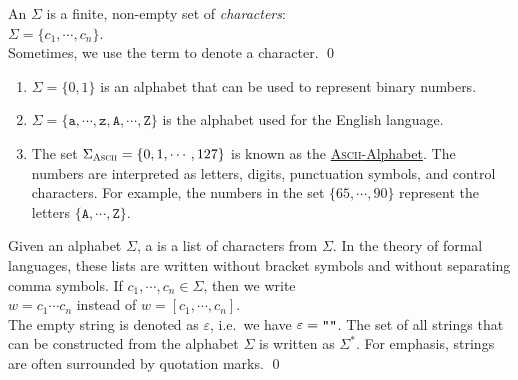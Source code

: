 \begin{Definition}[Alphabet]
An  $\Sigma$  is a finite, non-empty set of \emph{characters}:
\\[0.2cm]
\hspace*{1.3cm}
$\Sigma = \{ c_1, \cdots, c_n \}$. 
\\[0.2cm]
Sometimes, we use the term   to denote a character.
\qed
\end{Definition}

\examplesEng
\begin{enumerate}
\item $\Sigma = \{ 0, 1\}$ is an alphabet that can be used to represent binary numbers.
\item $\Sigma = \{ \mathtt{a}, \cdots, \mathtt{z}, \mathtt{A}, \cdots, \mathtt{Z} \}$ 
      is the alphabet used for the English language.
\item The set $\Sigma_{\textsc{\scriptsize Ascii}} = \{ 0, 1, \cdots, 127 \}$ is known as the
      \href{http://en.wikipedia.org/wiki/ASCII}{\textsc{Ascii}-Alphabet}.  The numbers are
      interpreted as letters, digits, punctuation symbols, and control characters.
      For example, the numbers in the set $\{65, \cdots, 90 \}$ represent the letters
      $\{\mathtt{A}, \cdots, \mathtt{Z}\}$.  
      \eox
\end{enumerate}

\begin{Definition}[Strings]
Given an alphabet $\Sigma$, a   is a list of characters from $\Sigma$.
In the theory of formal languages, these lists are written without bracket symbols and without
separating comma symbols.  If $c_1,\cdots,c_n \in \Sigma$, then we write 
\\[0.2cm]
\hspace*{1.3cm}
$w = c_1\cdots c_n$ \quad instead of \quad $w = [c_1,\cdots,c_n]$.
\\[0.2cm]
The empty string is denoted as $\varepsilon$,\index{$\varepsilon$} i.e.~we have $\varepsilon =
\texttt{\symbol{34}\symbol{34}}$.
The set of all strings that can be constructed
from the alphabet $\Sigma$ is written as $\Sigma^*$. \index{$\Sigma^*$} For emphasis, strings are often
surrounded by quotation marks. \qed
\end{Definition}

